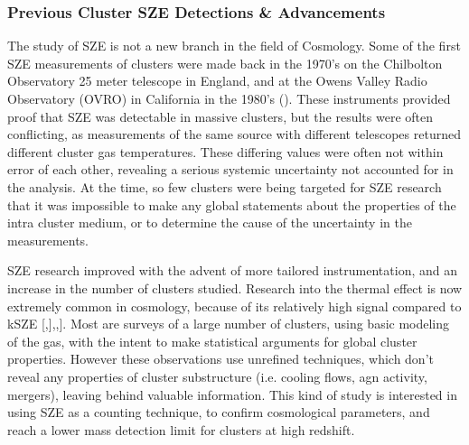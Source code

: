 \documentclass[manuscript]{aastex}
\begin{document}

    


\subsubsection{\textbf{Previous Cluster SZE Detections \& Advancements}}

The study of SZE is not a new branch in the field of Cosmology. Some of the first SZE measurements of clusters were made back in the 1970's on the Chilbolton Observatory 25 meter telescope in England, and at the Owens Valley Radio Observatory (OVRO) in California in the 1980's (\cite{Birkinshaw1999}). These instruments provided proof that SZE was detectable in massive clusters, but the results were often conflicting, as measurements of the same source with different telescopes returned different cluster gas temperatures. These differing values were often not within error of each other, revealing a serious systemic uncertainty not accounted for in the analysis. At the time, so few clusters were being targeted for SZE research that it was impossible to make any global statements about the properties of the intra cluster medium, or to determine the cause of the uncertainty in the measurements. 

SZE research improved with the advent of more tailored instrumentation, and an increase in the number of clusters studied. Research into the thermal effect is now extremely common in cosmology, because of its relatively high signal compared to kSZE [\cite{Benson2013},\cite{Saliwanchik2015}],\cite{Bleem2015},\cite{Planck2016}]. Most are surveys of a large number of clusters, using basic modeling of the gas, with the intent to make statistical arguments for global cluster properties. However these observations use unrefined techniques, which don't reveal any properties of cluster substructure (i.e. cooling flows, agn activity, mergers), leaving behind valuable information. This kind of study is interested in using SZE as a counting technique, to confirm cosmological parameters, and reach a lower mass detection limit for clusters at high redshift. 
\end{document}
